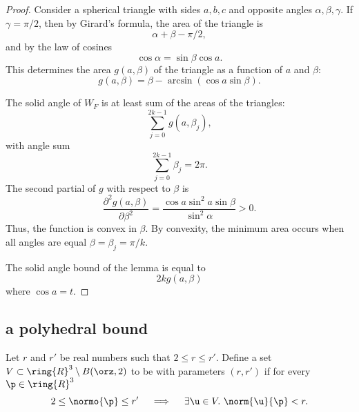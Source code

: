 \begin{proof}
Consider a spherical triangle with sides $a,b,c$ and opposite angles
$\alpha,\beta,\gamma$.  If $\gamma=\pi/2$, then by Girard's formula,
the area of the triangle is
\[  
\alpha+\beta-\pi/2,
\] 
and by the law of cosines 
\[  
\cos\alpha =\sin\beta\cos a.
\] 
This determines the area $g(a,\beta)$ of the triangle 
as a function of $a$ and $\beta$:
\[
g(a,\beta) = \beta - \arcsin(\cos a \sin \beta).
\]
%
%
%
%
%
%
%
%

The solid angle of $W_F$ is at least sum of the areas of the triangles:
\[  
\sum_{j=0}^{2k-1} g(a,\beta_j),
\] 
with angle sum
\[  
\sum_{j=0}^{2k-1} \beta_j = 2\pi.
\] 
The second partial of $g$ with respect to $\beta$ is
\[  
\frac{\partial^2 g(a,\beta)}{\partial \beta^2} = 
\frac{\cos a\sin^2 a\sin \beta}{\sin^2\alpha} > 0.
\] 
Thus, the function is convex in $\beta$.  By convexity, the minimum area
occurs when all angles are equal $\beta=\beta_j = \pi/k$.

The solid angle bound of the lemma is equal to 
\[  
2 k g(a,\beta)
\] 
where $\cos a=t$.  
\end{proof}




\subsection{a polyhedral bound}

\begin{definition} 
\label{def:weakly-saturated}
Let $r$ and $r'$ be real numbers such that $2\le r\le r'$.  Define a
set $ V\subset\ring{R}^3\setminus B(\orz,2)$ to be  with parameters $(r,r')$ if for every $\p\in\ring{R}^3$
\[  
2\le\normo{\p}\le r'~~~\implies~~~ \exists \u\in V.~\norm{ \u}{\p}< r.
\] 
\end{definition}

